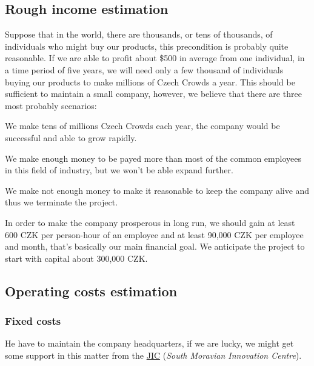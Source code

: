 \documentclass[a4paper,twoside,15pt]{book}
\begin{document}
		\subsection{Rough income estimation}
			Suppose that in the world, there are thousands, or tens of thousands, of individuals who might buy our products, this precondition is probably quite reasonable. If we are able to profit about \$500 in average from one individual, in a time period of five years, we will need only a few thousand of individuals buying our products to make millions of Czech Crowds a year. This should be sufficient to maintain a small company, however, we believe that there are three most probably scenarios:
			\begin{dinglist}{73}
				\item[\ding{246}] We make tens of millions Czech Crowds each year, the company would be successful and able to grow rapidly.
				\item[\ding{245}] We make enough money to be payed more than most of the common employees in this field of industry, but we won't be able expand further.
				\item[\ding{244}] We make not enough money to make it reasonable to keep the company alive and thus we terminate the project.
			 \end{dinglist}
			 In order to make the company prosperous in long run, we should gain at least 600 CZK per person-hour of an employee and at least 90,000 CZK per employee and month, that's basically our main financial goal. We anticipate the project to start with capital about 300,000 CZK.

		\subsection{Operating costs estimation}
			\subsubsection{Fixed costs}
				He have to maintain the company headquarters, if we are lucky, we might get some support in this matter from the \href{http://www.jic.cz/}{JIC} (\textit{South Moravian Innovation Centre}).
\end{document}
